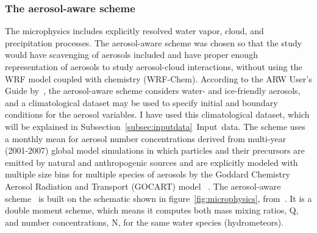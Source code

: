 \subsubsection{The aerosol-aware scheme}
The microphysics includes explicitly resolved water vapor, cloud, and precipitation processes. The aerosol-aware scheme was chosen so that the study would have scavenging of aerosols included and have proper enough representation of aerosols to study aerosol-cloud interactions, without using the WRF model coupled with chemistry (WRF-Chem).
According to the ARW User's Guide by~\citet{Wang2015}, the aerosol-aware scheme considers water- and ice-friendly aerosols, and a climatological dataset may be used to specify initial and boundary conditions for the aerosol variables. I have used this climatological dataset, which will be explained in Subsection~\ref{subsec:inputdata}~Input~data. The scheme uses a monthly mean for aerosol number concentrations derived from multi-year (2001-2007) global model simulations in which particles and their precursors are emitted by natural and anthropogenic sources and are explicitly modeled with multiple size bins for multiple species of aerosols by the Goddard Chemistry Aerosol Radiation and Transport (GOCART) model %
~\citep{Thompson2014}.
The aerosol-aware scheme~\citep{Thompson2014} is built on the schematic shown in figure~\ref{fig:microphysics}, from~\citet{Reisner1998}. It is a double moment scheme, which means it computes both mass mixing ratios, Q, and number concentrations, N, for the same water species (hydrometeors). 

